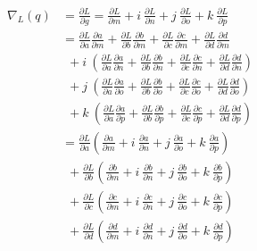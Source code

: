 \begin{align}
\nabla_L(q) &= \frac{\partial L}{\partial g} = \frac{\partial L}{\partial m} + \textit{i}~\frac{\partial L}{\partial n} + \textit{j}~\frac{\partial L}{\partial o} + \textit{k}~\frac{\partial L}{\partial p} \\ \nonumber
&= \frac{\partial L}{\partial a}\frac{\partial a}{\partial m} + \frac{\partial L}{\partial b}\frac{\partial b}{\partial m} + \frac{\partial L}{\partial c}\frac{\partial c}{\partial m} + \frac{\partial L}{\partial d}\frac{\partial d}{\partial m} \\ \nonumber
&~~+ \textit{i}~\left( \frac{\partial L}{\partial a}\frac{\partial a}{\partial n} + \frac{\partial L}{\partial b}\frac{\partial b}{\partial n} + \frac{\partial L}{\partial c}\frac{\partial c}{\partial n} + \frac{\partial L}{\partial d}\frac{\partial d}{\partial n} \right) \\ \nonumber
&~~+ \textit{j}~\left( \frac{\partial L}{\partial a}\frac{\partial a}{\partial o} + \frac{\partial L}{\partial b}\frac{\partial b}{\partial o} + \frac{\partial L}{\partial c}\frac{\partial c}{\partial o} + \frac{\partial L}{\partial d}\frac{\partial d}{\partial o} \right) \\ \nonumber
&~~+ \textit{k}~\left( \frac{\partial L}{\partial a}\frac{\partial a}{\partial p} + \frac{\partial L}{\partial b}\frac{\partial b}{\partial p} + \frac{\partial L}{\partial c}\frac{\partial c}{\partial p} + \frac{\partial L}{\partial d}\frac{\partial d}{\partial p} \right) \\ \nonumber
&= \frac{\partial L}{\partial a} \left( \frac{\partial a}{\partial m} + \textit{i}~\frac{\partial a}{\partial n} + \textit{j}~\frac{\partial a}{\partial o} + \textit{k}~\frac{\partial a}{\partial p} \right) \\ \nonumber
&~~+ \frac{\partial L}{\partial b} \left( \frac{\partial b}{\partial m} + \textit{i}~\frac{\partial b}{\partial n} + \textit{j}~\frac{\partial b}{\partial o} + \textit{k}~\frac{\partial b}{\partial p} \right) \\ \nonumber
&~~+ \frac{\partial L}{\partial c} \left( \frac{\partial c}{\partial m} + \textit{i}~\frac{\partial c}{\partial n} + \textit{j}~\frac{\partial c}{\partial o} + \textit{k}~\frac{\partial c}{\partial p} \right) \\ \nonumber
&~~+ \frac{\partial L}{\partial d} \left( \frac{\partial d}{\partial m} + \textit{i}~\frac{\partial d}{\partial n} + \textit{j}~\frac{\partial d}{\partial o} + \textit{k}~\frac{\partial d}{\partial p} \right) \\ \nonumber

\end{align}
